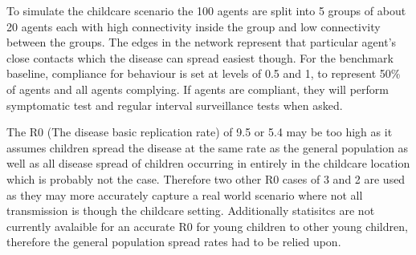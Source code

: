 \documentclass{article}
\begin{document}
To simulate the childcare scenario the 100 agents are split into 5 groups of about 20 agents each with high connectivity inside the group and low connectivity between the groups. The edges in the network represent that particular agent's close contacts which the disease can spread easiest though. For the benchmark baseline, compliance for behaviour is set at levels of 0.5 and 1, to represent 50\% of agents and all agents complying. If agents are compliant, they will perform symptomatic test and regular interval surveillance tests when asked.\newline

The R0 (The disease basic replication rate) of 9.5 or 5.4 may be too high as it assumes children spread the disease at the same rate as the general population as well as all disease spread of children occurring in entirely in the childcare location which is probably not the case. Therefore two other R0 cases of 3 and 2 are used as they may more accurately capture a real world scenario where not all transmission is though the childcare setting. Additionally statisitcs are not currently avalaible for an accurate R0 for young children to other young children, therefore the general population spread rates had to be relied upon. \newline
\end{document}
